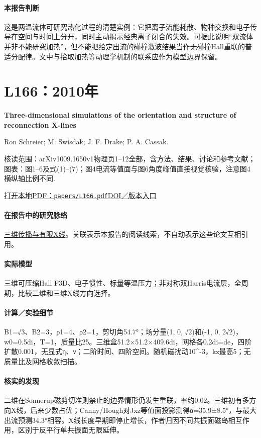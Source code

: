 \paragraph{本报告判断}这是两温流体可研究热化过程的清楚实例：它把离子流能耗散、物种交换和电子传导在空间与时间上分开，同时主动揭示经典离子闭合的失效。可据此说明“双流体并非不能研究加热”，但不能把给定出流的碰撞激波结果当作无碰撞Hall重联的普适分配律。文中与拾取加热等动理学机制的联系应作为模型边界保留。

\section{L166：2010年}\label{paper:L166}

\textbf{Three-dimensional simulations of the orientation and structure of reconnection X-lines}\citep{L166}\

Ron Schreier;  M. Swisdak;  J. F. Drake;  P. A. Cassak.

\textsf{核读范围：}arXiv1009.1650v1物理页1–12全部，含方法、结果、讨论和参考文献；\textsf{图表：}图1–6及式(1)–(7)；图4电流等值面与图6角度峰值直接视觉核验，注意图4横纵轴比例不同.

\href{run:papers/L166.pdf}{打开本地PDF：\texttt{papers/L166.pdf}}\quad\href{https://doi.org/10.1063/1.3494218}{DOI／版本入口}

\paragraph{在报告中的研究脉络}\hyperref[story:three]{三维传播与有限X线}。关联表示本报告的阅读线索，不自动表示这些论文互相引用。

\paragraph{实际模型}三维可压缩Hall F3D、电子惯性、标量等温压力；非对称双Harris电流层，全周期，比较二维和三维X线方向选择。

\paragraph{计算／实验细节}B1=√3、B2=3，ρ1=4、ρ2=1，剪切角54.7°；场分量(1, 0, √2)和(-1, 0, 2√2)，w0=0.5di，T=1，质量比25。三维盒51.2×51.2×409.6di，网格各0.2di=de，四阶扩散0.001，无显式η、ν；二阶时间、四阶空间。随机磁扰动10\textasciicircum{}-3，kz最高5；无质量比及网格收敛扫描。

\paragraph{核实的发现}二维在Sonnerup磁剪切准则禁止的边界情形仍发生重联，率约0.02。三维初有多方向X线，后来少数占优；Canny/Hough对Jxz等值面投影测得α=35.9±8.5°，与最大出流预测34.3°相容。X线长度早期即停止增长，作者归因不同共振面磁岛相互作用，区别于反平行单共振面无限延伸。

